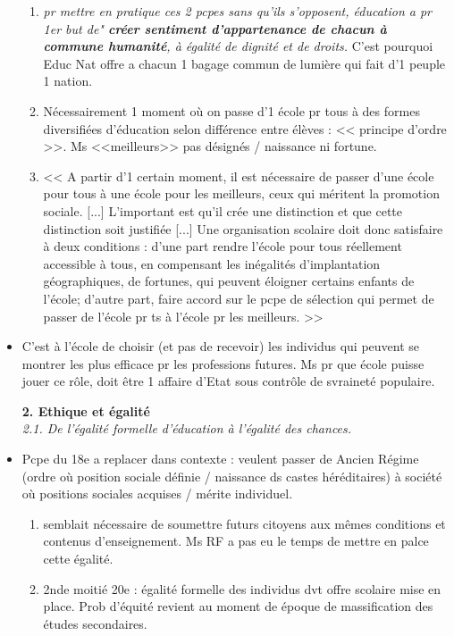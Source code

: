 \documentclass[12pt]{article}
\begin{document}
\begin{itemize}
{\begin{minipage}{19cm}
\begin{enumerate}
\item \textit{pr mettre en pratique ces 2 pcpes sans qu'ils s'opposent, éducation a pr 1er but de" \textbf{créer sentiment d'appartenance de chacun à commune humanité}, à égalité de dignité et de droits.} C'est pourquoi Educ Nat offre a chacun 1 bagage commun de lumière qui fait d'1 peuple 1 nation.\\
\item Nécessairement 1 moment où on passe d'1 école pr tous à des formes diversifiées d'éducation selon différence entre élèves : << principe d'ordre >>. Ms <<meilleurs>> pas désignés / naissance ni fortune.  \\
\item << A partir d'1 certain moment, il est nécessaire de passer d'une école pour tous à une école pour les meilleurs, ceux qui méritent la promotion sociale. [...] L'important est qu'il crée une distinction et que cette distinction soit justifiée [...] Une organisation scolaire doit donc satisfaire à deux conditions : d'une part rendre l'école pour tous réellement accessible à tous, en compensant les inégalités d'implantation géographiques, de fortunes, qui peuvent éloigner certains enfants de l'école; d'autre part, faire accord sur le pcpe de sélection qui permet de passer de l'école pr ts à l'école pr les meilleurs. >>
\end{enumerate}

\end{minipage}
}


\vspace{0.5cm}

\item C'est à l'école de choisir (et pas de recevoir) les individus qui peuvent se montrer les plus efficace pr les professions futures. Ms pr que école puisse jouer ce rôle, doit être 1 affaire d'Etat sous contrôle de svraineté populaire.

\textbf{2. Ethique et égalité} \\

\textit{2.1. De l'égalité formelle d'éducation à l'égalité des chances.} \\

\item Pcpe du 18e a replacer dans contexte : veulent passer de Ancien Régime (ordre où position sociale définie / naissance ds castes héréditaires) à société où positions sociales acquises / mérite individuel.\\
\begin{enumerate}
\item semblait nécessaire de soumettre futurs citoyens aux mêmes conditions et contenus d'enseignement. Ms RF a pas eu le temps de mettre en palce cette égalité. \\
\item 2nde moitié 20e : égalité formelle des individus dvt offre scolaire mise en place. Prob d'équité revient au moment de époque de massification des études secondaires.\\
\end{enumerate}


\end{itemize}
\end{document}

